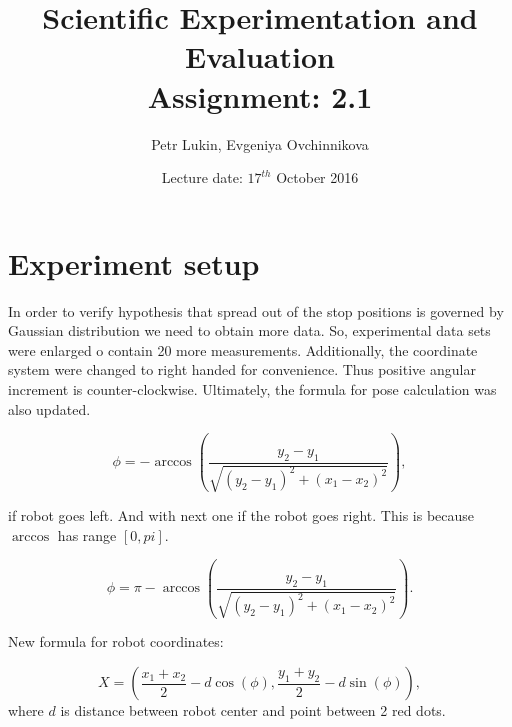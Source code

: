 \documentclass[a4paper, 12pt]{article}
\title{Scientific Experimentation and Evaluation  \\
				Assignment: 2.1}
\author{Petr Lukin, Evgeniya Ovchinnikova}
\date{Lecture date: $17^{th}$ October 2016}
\begin{document}



\maketitle

\section{Experiment setup}
In order to verify hypothesis that spread out of the stop positions is governed by Gaussian distribution we need to obtain more data. So, experimental data sets were enlarged o contain 20 more measurements. Additionally, the coordinate system were changed to right handed for convenience. Thus positive angular increment is counter-clockwise. Ultimately, the formula for pose calculation was also updated.

\begin{equation}
\phi = -\arccos(\frac{y_2-y_1}{\sqrt{(y_2-y_1)^2+(x_1-x_2)^2}}),
\end{equation}

if robot goes left. And with next one if the robot goes right. This is because $\arccos$ has range $[0, pi]$.

\begin{equation}
\phi = \pi-\arccos(\frac{y_2-y_1}{\sqrt{(y_2-y_1)^2+(x_1-x_2)^2}}).
\end{equation}

New formula for robot coordinates:

\begin{equation}
X = (\frac{x_1+x_2}{2}-d \cos(\phi),\frac{y_1+y_2}{2}-d \sin(\phi)),
\end{equation}
where $d$ is distance between robot center and point between 2 red dots.
\end{document}
